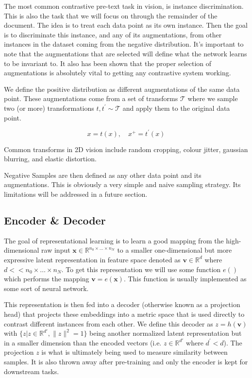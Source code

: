 \documentclass[12pt]{article}
\begin{document}
The most common contrastive pre-text task in vision, is instance discrimination. This is also the task that we will focus on through the remainder of the document. The idea is to treat each data point as its own instance. Then the goal is to discriminate this instance, and any of its augmentations, from other instances in the dataset coming from the negative distribution. It's important to note that the augmentations that are selected will define what the network learns to be invariant to. It also has been shown that the proper selection of augmentations is absolutely vital to getting any contrastive system working.
%

We define the positive distribution as different augmentations of the same data point. These augmentations come from a set of transforms $\mathcal{T}$ where we sample two (or more) transformations $ t, t^{'} \sim \mathcal{T} $ and apply them to the original data point.
% 

$$x = t(x), \quad x^{+} = t^{'}(x)$$

Common transforms in 2D vision include random cropping, colour jitter, gaussian blurring, and elastic distortion.
%

Negative Samples are then defined as any other data point and its augmentations. This is obviously a very simple and naive sampling strategy. Its limitations will be addressed in a future section.
%

\subsection{Encoder \& Decoder}

The goal of representational learning is to learn a good mapping from the high-dimensional raw input $\mathbf{x} \in \mathbb{R}^{n_0 \times \dots \times n_N}$ to a smaller one-dimensional but more expressive latent representation in feature space denoted as $\mathbf{v} \in \mathbb{R}^{d}$ where $d << n_0 \times \dots \times n_N$. To get this representation we will use some function $e()$ which performs the mapping $\mathbf{v} = e(\mathbf{x})$. This function is usually implemented as some sort of neural network.
%

This representation is then fed into a decoder (otherwise known as a projection head) that projects these embeddings into a metric space that is used directly to contrast different instances from each other. We define this decoder as $z=h(\mathbf{v})$ with $\{z | z \in \mathbb{R}^{d'}, \lVert z \lVert^{2} = 1\}$ being another normalized latent representation but in a smaller dimension than the encoded vectors (i.e. $z \in \mathbb{R}^{d'}$ where $d^{'} < d$). The projection $z$ is what is ultimately being used to measure similarity between samples. It is also thrown away after pre-training and only the encoder is kept for downstream tasks.
\end{document}
